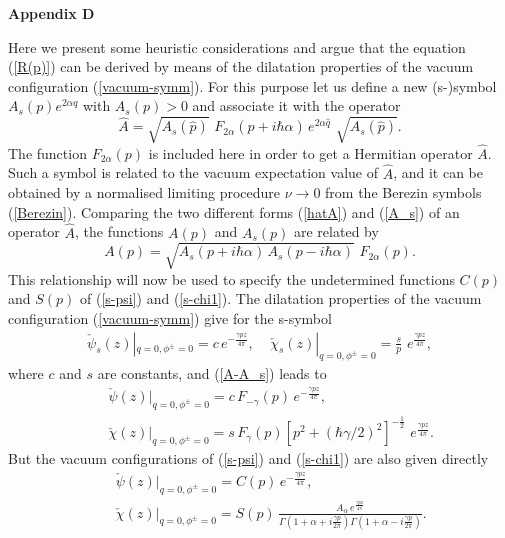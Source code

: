 \documentclass[a4paper,12pt]{article}
\def\theequation{\arabic{section}.\arabic{equation}}
\begin{document}
\vspace{0.5cm}
\setcounter{equation}{0}
\def\theequation{D.\arabic{equation}}

{\bf {\Large Appendix D}}

\vspace{0.5cm}

\noindent
Here we present some heuristic considerations and argue
that the equation
(\ref{R(p)}) can be derived by means of the dilatation properties
of the vacuum configuration (\ref{vacuum-symm}). For this
purpose let us define a new (s-)symbol
$A_s(p)e^{2\alpha q}$ with $A_s(p)>0$ and associate it with the operator
\begin{equation}\label{A_s}
\hat A =\sqrt{A_s(\hat p)}\,\,F_{2\alpha}(\hat p+i\hbar\alpha)
\,e^{2\alpha\hat q}
\,\,\sqrt{A_s(\hat p)}.
\end{equation}
The function $F_{2\alpha}(p)$ is included here in order to
get a  Hermitian operator
$\hat A$.
Such a symbol is related to the vacuum expectation value of $\hat A$,
and it can be obtained by a normalised limiting
procedure $\nu\rightarrow 0$ from the Berezin symbols (\ref{Berezin}).
Comparing the two different forms (\ref{hatA}) and (\ref{A_s})
of an operator $\hat A$,
the functions $A(p)$ and $A_s(p)$ are related by
\begin{equation}\label{A-A_s}
A(p) =\sqrt{A_s(p+i\hbar\alpha)\,A_s(p-i\hbar\alpha)}\,\,F_{2\alpha}(p).
\end{equation}
This relationship will now be used to specify the undetermined
functions $C(p)$ and $S(p)$ of (\ref{s-psi}) and (\ref{s-chi1}).
The dilatation properties of the vacuum configuration
(\ref{vacuum-symm}) give
for the s-symbol
\begin{eqnarray}\label{vacuum-psi_s,chi_s}
\check\psi_s(z)|_{q=0,\phi^\pm=0}=
c\,e^{-\frac{\gamma pz}{4\pi}},~~~~~
\check\chi_s(z)|_{q=0,\phi^\pm=0}=\frac{s}{p}\,
\,e^{\frac{\gamma pz}{4\pi}},
\end{eqnarray}
where $c$ and $s$ are constants, and
(\ref{A-A_s}) leads to
\begin{eqnarray}\label{vacuum-psi}
&&\check\psi(z)|_{q=0,\phi^\pm=0}=c\,F_{-\gamma}(p)
\,e^{-\frac{\gamma pz}{4\pi}},\\
\label{vacuum-chi}
&&\check\chi(z)|_{q=0,\phi^\pm=0}=s\,F_\gamma(p)\left[p^2+
(\hbar\gamma/2)^2\right]^{-\frac{1}{2}}\,
\,e^{\frac{\gamma pz}{4\pi}}.
\end{eqnarray}
But the vacuum configurations of  (\ref{s-psi}) and (\ref{s-chi1}) are
also given directly
\begin{eqnarray}\label{vacuum-psi1}
&&\check\psi(z)|_{q=0,\phi^\pm=0}=C(p)\,e^{-\frac{\gamma pz}{4\pi}} ,\\
\label{vacuum-chi1}
&&\check\chi(z)|_{q=0,\phi^\pm=0}=S(p)\,
\frac{A_\alpha\,e^{\frac{\gamma pz}{4\pi}}}{
\Gamma(1+\alpha+i\frac{\gamma p}{2\pi})
\Gamma(1+\alpha-i\frac{\gamma p}{2\pi})}.
\end{eqnarray}
\end{document}

